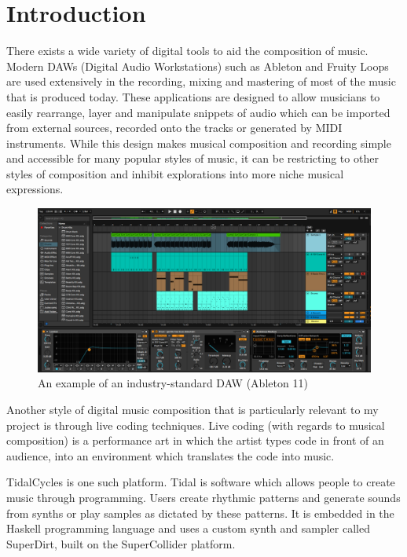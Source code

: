 \documentclass{article}
\begin{document}
\section*{Introduction}

There exists a wide variety of digital tools to aid the composition of music. Modern DAWs (Digital Audio Workstations) such as Ableton and Fruity Loops are used extensively in the recording, mixing and mastering of most of the music that is produced today. These applications are designed to allow musicians to easily rearrange, layer and manipulate snippets of audio which can be imported from external sources, recorded onto the tracks or generated by MIDI instruments. While this design makes musical composition and recording simple and accessible for many popular styles of music, it can be restricting to other styles of composition and inhibit explorations into more niche musical expressions. 
\begin{figure}[h]
    \centering
    \includegraphics[scale=0.3]{images/ableton example.png}
    \caption{An example of an industry-standard DAW (Ableton 11)}
    \label{fig:ableton}
\end{figure}

Another style of digital music composition that is particularly relevant to my project is through live coding techniques. Live coding (with regards to musical composition) is a performance art in which the artist types code in front of an audience, into an environment which translates the code into music.

TidalCycles is one such platform. Tidal is software which allows people to create music through programming. Users create rhythmic patterns and generate sounds from synths or play samples as dictated by these patterns. It is embedded in the Haskell programming language and uses a custom synth and sampler called SuperDirt, built on the SuperCollider platform.
\end{document}
